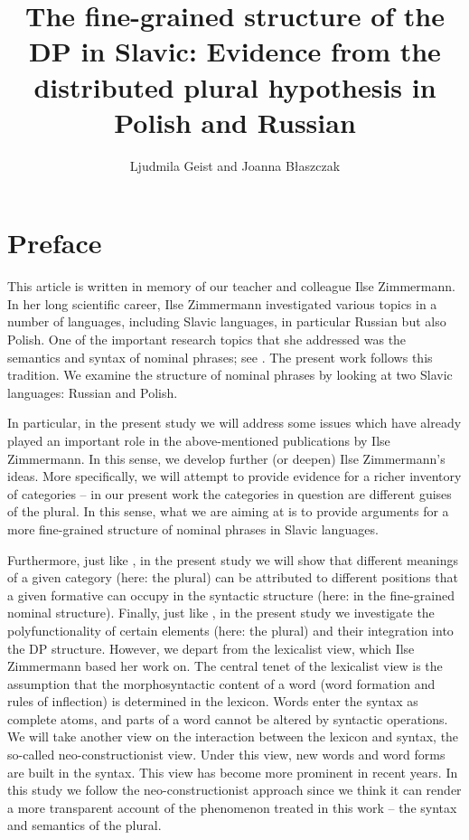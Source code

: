 \documentclass[output=paper,colorlinks,citecolor=brown]{langscibook}
\author{Ljudmila Geist\affiliation{University of Stuttgart}\orcid{0000-0001-7907-4958} and Joanna Błaszczak\affiliation{University of Wrocław}\orcid{0000-0002-8332-2827}}
\title{The fine-grained structure of the DP in Slavic: Evidence from the distributed plural hypothesis in Polish and Russian}
\begin{document}
\maketitle


\section*{Preface}
This article is written in memory of our teacher and colleague Ilse Zimmermann. In her long scientific career, Ilse Zimmermann investigated various topics in a number of languages, including Slavic languages, in particular Russian but also Polish. One of the important research topics that she addressed was the semantics and syntax of nominal phrases; see \citet{Zimmermann1983,gb:Zimmermann1988,Zimmermann1991,Zimmermann2008}. The present work follows this tradition. We examine the structure of nominal phrases by looking at two Slavic languages: Russian and Polish.

In particular, in the present study we will address some issues which have already played an important role in the above-mentioned publications by Ilse Zimmermann. In this sense, we develop further (or deepen) Ilse Zimmermann's ideas. More specifically, we will attempt to provide evidence for a richer inventory of categories -- in our present work the categories in question are different guises of the plural. In this sense, what we are aiming at is to provide arguments for a more fine-grained structure of nominal phrases in Slavic languages.

Furthermore, just like \citet{gb:Zimmermann1988}, in the present study we will show that different meanings of a given category (here: the plural) can be attributed to different positions that a given formative can occupy in the syntactic structure (here: in the fine-grained nominal structure).
Finally, just like \citet{Zimmermann2008}, in the present study we investigate the polyfunctionality of certain elements (here: the plural) and their integration into the DP structure. However, we depart from the lexicalist view, which Ilse Zimmermann based her work on. The central tenet of the lexicalist view is the assumption that the morphosyntactic content of a word (word formation and rules of inflection) is determined in the lexicon. Words enter the syntax as complete atoms, and parts of a word cannot be altered by syntactic operations. We will take another view on the interaction between the lexicon and syntax, the so-called neo-constructionist view. Under this view, new words and word forms are built in the syntax. This view has become more prominent in recent years. In this study we follow the neo-constructionist approach since we think it can render a more transparent account of the phenomenon treated in this work -- the syntax and semantics of the plural. 
\end{document}
